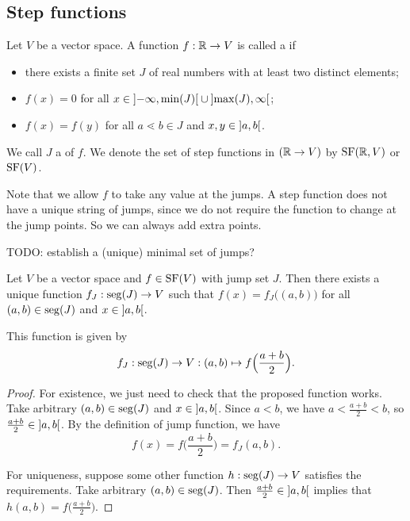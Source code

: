 \subsection{Step functions}
\begin{definition}
Let $V$ be a vector space. A function $f: \mathbb{R} \to V$ is called a  if
\begin{itemize}
\item there exists a finite set $J$ of real numbers with at least two distinct elements;
\item $f(x) = 0$ for all $x\in \interval[o]{-\infty, \min(J)} \cup \interval[o]{\max(J), \infty}$;
\item $f(x) = f(y)$ for all $a \lessdot b \in J$ and $x,y\in \interval[o]{a,b}$.
\end{itemize}
We call $J$ a  of $f$. We denote the set of step functions in $(\mathbb{R}\to V)$ by $\operatorname{SF}(\mathbb{R},V)$ or $\operatorname{SF}(V)$.
\end{definition}
Note that we allow $f$ to take any value at the jumps. A step function does not have a unique string of jumps, since we do not require the function to change at the jump points. So we can always add extra points.

TODO: establish a (unique) minimal set of jumps?

\begin{lemma} \label{segmentFunctionAssociatedToStepFunction}
Let $V$ be a vector space and $f\in \operatorname{SF}(V)$ with jump set $J$. Then there exists a unique function $f_J: \operatorname{seg}(J) \to V$ such that $f(x) = f_J\big((a,b)\big)$ for all $(a,b)\in \operatorname{seg}(J)$ and $x\in \interval[o]{a,b}$.

This function is given by
\[ f_J: \operatorname{seg}(J) \to V: (a,b) \mapsto f\Big(\frac{a+b}{2}\Big). \]
\end{lemma}
\begin{proof}
For existence, we just need to check that the proposed function works. Take arbitrary $(a,b)\in \operatorname{seg}(J)$ and $x\in \interval[o]{a,b}$. Since $a < b$, we have $a < \frac{a+b}{2} < b$, so $\frac{a+b}{2}\in \interval[o]{a,b}$. By the definition of jump function, we have
\[ f(x) = f\Big(\frac{a+b}{2}\Big) = f_J(a,b). \]

For uniqueness, suppose some other function $h: \operatorname{seg}(J) \to V$ satisfies the requirements. Take arbitrary $(a,b)\in \operatorname{seg}(J)$. Then $\frac{a+b}{2}\in \interval[o]{a,b}$ implies that $h(a,b) = f\Big(\frac{a+b}{2}\Big)$.
\end{proof}

